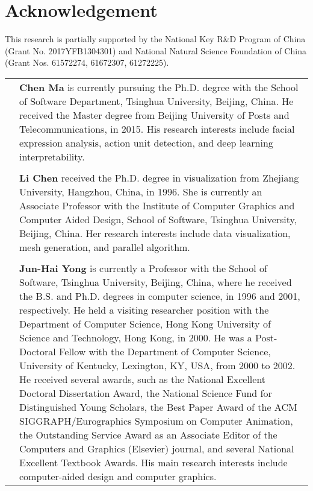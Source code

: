 \documentclass[5p,twocolumn]{elsarticle}
\begin{document}
\section*{Acknowledgement}
This research is partially supported by the National Key R\&D Program of China (Grant No. 2017YFB1304301) and National Natural Science Foundation of China (Grant Nos. 61572274, 61672307, 61272225).



\newpage

\begin{table}[htp!]
	\scriptsize
	\begin{tabular}{cp{6cm}}
		\raisebox{-0.9\height}{\texttt{[image: figure/author/ChenMa.png]}} & \textbf{Chen Ma} is currently pursuing the Ph.D. degree with the School of Software Department, Tsinghua University, Beijing, China. He received the Master degree from Beijing University of Posts and Telecommunications, in 2015. His research interests include facial expression analysis, action unit detection, and deep learning interpretability. \\
		& \\
		\raisebox{-0.9\height}{\texttt{[image: figure/author/LiChen.png]}} & \textbf{Li Chen} received the Ph.D. degree in visualization from Zhejiang University, Hangzhou, China, in 1996. She is currently an Associate Professor with the Institute of Computer Graphics and Computer Aided Design, School of Software, Tsinghua University, Beijing, China. Her research interests include data visualization, mesh generation, and parallel algorithm. \\
		& \\
		\raisebox{-0.9\height}{\includegraphics [width=0.15\textwidth]{figure/author/JunhaiYong.png}}
		&
		\textbf{Jun-Hai Yong} is currently a Professor with the School of Software, Tsinghua University, Beijing, China, where he received the B.S. and Ph.D. degrees in computer science, in 1996 and 2001, respectively. He held a visiting researcher position with the Department of Computer Science, Hong Kong University of Science and Technology, Hong Kong, in 2000. He was a Post-Doctoral Fellow with the Department of Computer Science, University of Kentucky, Lexington, KY, USA, from 2000 to 2002.
		He received several awards, such as the National Excellent Doctoral Dissertation Award, the National Science Fund for Distinguished Young Scholars, the Best Paper Award of the ACM SIGGRAPH/Eurographics Symposium on Computer Animation, the Outstanding Service Award as an Associate Editor of the Computers and Graphics (Elsevier) journal, and several National Excellent Textbook Awards. His main research interests include computer-aided design and computer graphics. \\

	\end{tabular}

\end{table}
\end{document}
